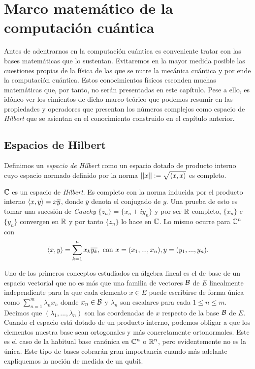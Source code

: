 \chapter{Marco matemático de la computación cuántica}

Antes de adentrarnos en la computación cuántica es conveniente tratar con las bases matemáticas que lo sustentan. Evitaremos en la mayor medida posible las cuestiones propias de la física de las que se nutre la mecánica cuántica y por ende la computación cuántica. Estos conocimientos físicos esconden muchas matemáticas que, por tanto, no serán presentadas en este capítulo. Pese a ello, es idóneo ver los cimientos de dicho marco teórico que podemos resumir en las propiedades y operadores que presentan los números complejos como espacio de \textit{Hilbert} que se asientan en el conocimiento construido en el capítulo anterior.

\section{Espacios de Hilbert}
\begin{definition} Definimos un \textit{espacio de Hilbert} como un espacio dotado de producto interno cuyo espacio normado definido por la norma $\left|\left|x\right|\right|:=\sqrt{\langle x,x\rangle}$ es completo.
\end{definition}

\begin{example} \label{ex:ex32} $\mathbb{C}$ es un espacio de \textit{Hilbert}. Es completo con la norma inducida por el producto interno $\langle x,y\rangle=x\overline{y}$, donde $\overline{y}$ denota el conjugado de $y$. Una prueba de esto es tomar una sucesión de \textit{Cauchy} $\{z_n\}=\{x_n+iy_n\}$ y por ser $\mathbb{R}$ completo, $\{x_n\}$ e $\{y_n\}$ convergen en $\mathbb{R}$ y por tanto $\{z_n\}$ lo hace en $\mathbb{C}$. Lo mismo ocurre para $\mathbb{C}^n$ con
\begin{equation}\dotproduct{x}{y}=\sum^{n}_{k=1}x_k\overline{y_k},\mathrm{\ con\ } x=(x_1,...,x_n), y=(y_1,...,y_n).
\end{equation}
\end{example}

Uno de los primeros conceptos estudiados en álgebra lineal es el de base de un espacio vectorial que no es más que una familia de vectores $\mathcal{B}$ de $E$ linealmente independiente para la que cada elemento $x\in E$ puede escribirse de forma única como $\sum_{n=1}^m\lambda_nx_n$ donde $x_n\in\mathcal{B}$ y $\lambda_n$ son escalares para cada $1\leq n\leq m$. Decimos que $(\lambda_1,...,\lambda_n)$ son las coordenadas de $x$ respecto de la base $\mathcal{B}$ de $E$. Cuando el espacio está dotado de un producto interno, podemos obligar a que los elementos nuestra base sean ortogonales y más concretamente ortonormales. Este es el caso de la habitual base canónica en $\mathbb{C}^n$ o $\mathbb{R}^n$, pero evidentemente no es la única. Este tipo de bases cobrarán gran importancia cuando más adelante expliquemos la noción de medida de un qubit.

